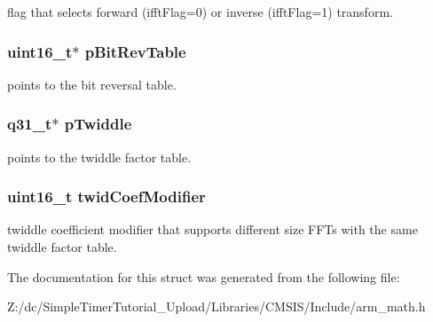 flag that selects forward (ifft\-Flag=0) or inverse (ifft\-Flag=1) transform. \hypertarget{structarm__cfft__radix4__instance__q31_a46a2fb328199897af100fea0bfdf59aa}{
\subsubsection[{p\-Bit\-Rev\-Table}]{\setlength{\rightskip}{0pt plus 5cm}uint16\-\_\-t$\ast$ p\-Bit\-Rev\-Table}}\label{structarm__cfft__radix4__instance__q31_a46a2fb328199897af100fea0bfdf59aa}
points to the bit reversal table. \hypertarget{structarm__cfft__radix4__instance__q31_a2505b7d5ec077b244c712797a5253b6d}{
\subsubsection[{p\-Twiddle}]{\setlength{\rightskip}{0pt plus 5cm}q31\-\_\-t$\ast$ p\-Twiddle}}\label{structarm__cfft__radix4__instance__q31_a2505b7d5ec077b244c712797a5253b6d}
points to the twiddle factor table. \hypertarget{structarm__cfft__radix4__instance__q31_afe772e5b5001c9d8e85032115a8df5bf}{
\subsubsection[{twid\-Coef\-Modifier}]{\setlength{\rightskip}{0pt plus 5cm}uint16\-\_\-t twid\-Coef\-Modifier}}\label{structarm__cfft__radix4__instance__q31_afe772e5b5001c9d8e85032115a8df5bf}
twiddle coefficient modifier that supports different size F\-F\-Ts with the same twiddle factor table. 

The documentation for this struct was generated from the following file\-:\begin{DoxyCompactItemize}
\item 
Z\-:/dc/\-Simple\-Timer\-Tutorial\-\_\-\-Upload/\-Libraries/\-C\-M\-S\-I\-S/\-Include/arm\-\_\-math.\-h\end{DoxyCompactItemize}

